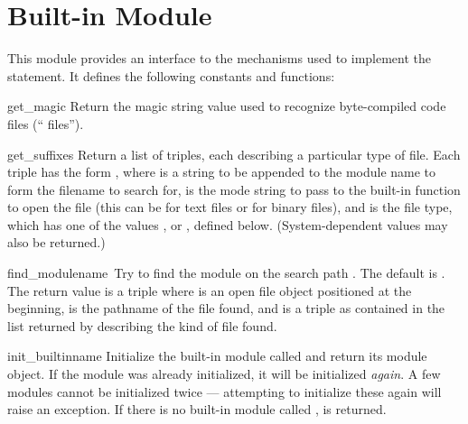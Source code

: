 \section{Built-in Module }

This module provides an interface to the mechanisms used to implement
the  statement.  It defines the following constants and
functions:

\renewcommand{\indexsubitem}{(in module imp)}

\begin{funcdesc}{get_magic}{}
Return the magic string value used to recognize byte-compiled code
files (`` files'').
\end{funcdesc}

\begin{funcdesc}{get_suffixes}{}
Return a list of triples, each describing a particular type of file.
Each triple has the form , where  is a string to be appended to the
module name to form the filename to search for,  is the mode
string to pass to the built-in  function to open the file
(this can be  for text files or  for binary
files), and  is the file type, which has one of the values
,  or , defined
below.  (System-dependent values may also be returned.)
\end{funcdesc}

\begin{funcdesc}{find_module}{name\, }
Try to find the module  on the search path .  The
default  is .  The return value is a triple
 where
 is an open file object positioned at the beginning,
 is the pathname of the
file found, and  is a triple as contained in the list
returned by  describing the kind of file found.
\end{funcdesc}

\begin{funcdesc}{init_builtin}{name}
Initialize the built-in module called  and return its module
object.  If the module was already initialized, it will be initialized
{\em again}.  A few modules cannot be initialized twice --- attempting
to initialize these again will raise an  exception.
If there is no
built-in module called ,  is returned.
\end{funcdesc}

